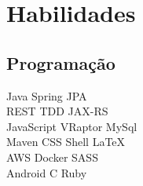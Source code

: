 \documentclass[]{deedy-resume-openfont}
\begin{document}
\begin{minipage}[t]{0.33\textwidth}

\section{Habilidades}
\subsection{Programação}
Java \textbullet{} Spring \textbullet{} JPA \\
REST \textbullet{} TDD \textbullet{} JAX-RS \\
JavaScript \textbullet{} VRaptor \textbullet{} MySql\\ 
Maven \textbullet{} CSS \textbullet{} Shell \textbullet{} \LaTeX\ \\
AWS \textbullet{} Docker \textbullet{} SASS\\
Android \textbullet{} C \textbullet{} Ruby\\

\sectionsep

%
%

\end{minipage} 
\hfill
\end{document}
